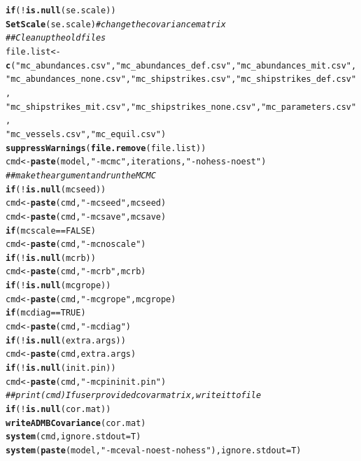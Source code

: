 \documentclass{article}\usepackage[]{graphicx}\usepackage[]{color}
\makeatletter
\newcommand{\hlnum}[1]{\textcolor[rgb]{0.686,0.059,0.569}{#1}}%
\newcommand{\hlstr}[1]{\textcolor[rgb]{0.192,0.494,0.8}{#1}}%
\newcommand{\hlcom}[1]{\textcolor[rgb]{0.678,0.584,0.686}{\textit{#1}}}%
\newcommand{\hlopt}[1]{\textcolor[rgb]{0,0,0}{#1}}%
\newcommand{\hlstd}[1]{\textcolor[rgb]{0.345,0.345,0.345}{#1}}%
\newcommand{\hlkwa}[1]{\textcolor[rgb]{0.161,0.373,0.58}{\textbf{#1}}}%
\newcommand{\hlkwb}[1]{\textcolor[rgb]{0.69,0.353,0.396}{#1}}%
\newcommand{\hlkwc}[1]{\textcolor[rgb]{0.333,0.667,0.333}{#1}}%
\newcommand{\hlkwd}[1]{\textcolor[rgb]{0.737,0.353,0.396}{\textbf{#1}}}%
\newenvironment{kframe}{%
 \def\at@end@of@kframe{}%
 \ifinner\ifhmode%
  \def\at@end@of@kframe{\end{minipage}}%
  \begin{minipage}{\columnwidth}%
 \fi\fi%
 \def\FrameCommand##1{\hskip\@totalleftmargin \hskip-\fboxsep
 \colorbox{shadecolor}{##1}\hskip-\fboxsep
     \hskip-\linewidth \hskip-\@totalleftmargin \hskip\columnwidth}%
 \MakeFramed {\advance\hsize-\width
   \@totalleftmargin\z@ \linewidth\hsize
   \@setminipage}}%
 {\par\unskip\endMakeFramed%
 \at@end@of@kframe}
\newenvironment{knitrout}{}{} %
\makeatother
\begin{document}
\begin{knitrout}
\begin{kframe}
\begin{alltt}
    \hlkwa{if} \hlstd{(}\hlopt{!}\hlkwd{is.null}\hlstd{(se.scale))}
        \hlkwd{SetScale}\hlstd{(se.scale)}  \hlcom{# change the covariance matrix}
    \hlcom{## Clean up the old files}
    \hlstd{file.list} \hlkwb{<-} \hlkwd{c}\hlstd{(}\hlstr{"mc_abundances.csv"}\hlstd{,} \hlstr{"mc_abundances_def.csv"}\hlstd{,} \hlstr{"mc_abundances_mit.csv"}\hlstd{,}
        \hlstr{"mc_abundances_none.csv"}\hlstd{,} \hlstr{"mc_shipstrikes.csv"}\hlstd{,} \hlstr{"mc_shipstrikes_def.csv"}\hlstd{,}
        \hlstr{"mc_shipstrikes_mit.csv"}\hlstd{,} \hlstr{"mc_shipstrikes_none.csv"}\hlstd{,} \hlstr{"mc_parameters.csv"}\hlstd{,}
        \hlstr{"mc_vessels.csv"}\hlstd{,} \hlstr{"mc_equil.csv"}\hlstd{)}
    \hlkwd{suppressWarnings}\hlstd{(}\hlkwd{file.remove}\hlstd{(file.list))}
    \hlstd{cmd} \hlkwb{<-} \hlkwd{paste}\hlstd{(model,} \hlstr{"-mcmc"}\hlstd{, iterations,} \hlstr{"-nohess -noest"}\hlstd{)}
    \hlcom{## make the argument and run the MCMC}
    \hlkwa{if} \hlstd{(}\hlopt{!}\hlkwd{is.null}\hlstd{(mcseed))}
        \hlstd{cmd} \hlkwb{<-} \hlkwd{paste}\hlstd{(cmd,} \hlstr{"-mcseed"}\hlstd{, mcseed)}
    \hlstd{cmd} \hlkwb{<-} \hlkwd{paste}\hlstd{(cmd,} \hlstr{"-mcsave"}\hlstd{, mcsave)}
    \hlkwa{if} \hlstd{(mcscale} \hlopt{==} \hlnum{FALSE}\hlstd{)}
        \hlstd{cmd} \hlkwb{<-} \hlkwd{paste}\hlstd{(cmd,} \hlstr{"-mcnoscale"}\hlstd{)}
    \hlkwa{if} \hlstd{(}\hlopt{!}\hlkwd{is.null}\hlstd{(mcrb))}
        \hlstd{cmd} \hlkwb{<-} \hlkwd{paste}\hlstd{(cmd,} \hlstr{"-mcrb"}\hlstd{, mcrb)}
    \hlkwa{if} \hlstd{(}\hlopt{!}\hlkwd{is.null}\hlstd{(mcgrope))}
        \hlstd{cmd} \hlkwb{<-} \hlkwd{paste}\hlstd{(cmd,} \hlstr{"-mcgrope"}\hlstd{, mcgrope)}
    \hlkwa{if} \hlstd{(mcdiag} \hlopt{==} \hlnum{TRUE}\hlstd{)}
        \hlstd{cmd} \hlkwb{<-} \hlkwd{paste}\hlstd{(cmd,} \hlstr{"-mcdiag"}\hlstd{)}
    \hlkwa{if} \hlstd{(}\hlopt{!}\hlkwd{is.null}\hlstd{(extra.args))}
        \hlstd{cmd} \hlkwb{<-} \hlkwd{paste}\hlstd{(cmd, extra.args)}
    \hlkwa{if} \hlstd{(}\hlopt{!}\hlkwd{is.null}\hlstd{(init.pin))}
        \hlstd{cmd} \hlkwb{<-} \hlkwd{paste}\hlstd{(cmd,} \hlstr{"-mcpin init.pin"}\hlstd{)}
    \hlcom{## print(cmd) If user provided covar matrix, write it to file}
    \hlkwa{if} \hlstd{(}\hlopt{!}\hlkwd{is.null}\hlstd{(cor.mat))}
        \hlkwd{writeADMBCovariance}\hlstd{(cor.mat)}
    \hlkwd{system}\hlstd{(cmd,} \hlkwc{ignore.stdout} \hlstd{= T)}
    \hlkwd{system}\hlstd{(}\hlkwd{paste}\hlstd{(model,} \hlstr{"-mceval -noest -nohess"}\hlstd{),} \hlkwc{ignore.stdout} \hlstd{= T)}


\end{alltt}
\end{kframe}
\end{knitrout}
\end{document}
